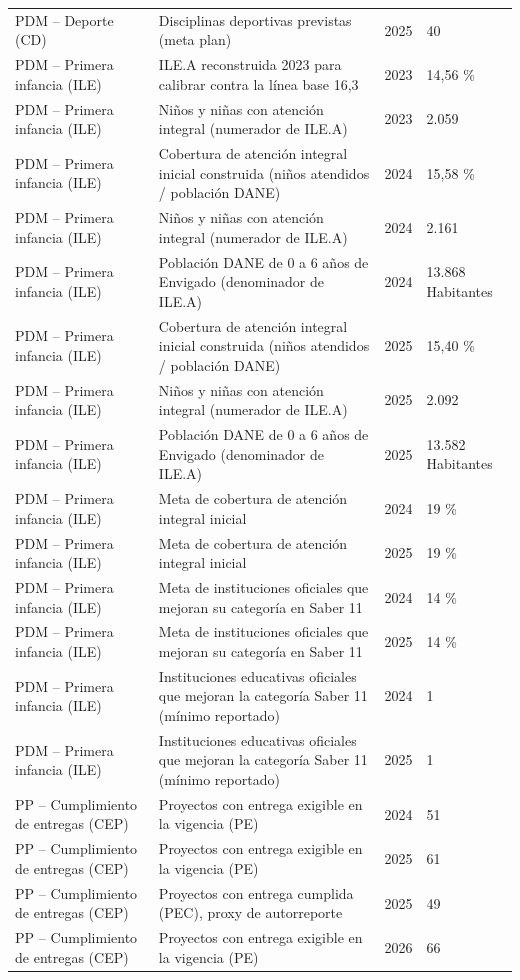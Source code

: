 \documentclass[11pt,letterpaper]{article}
\begin{document}
{\begin{xltabular}{\linewidth}{L{4cm}YL{1.6cm}L{2.6cm}}
PDM -- Deporte (CD) & Disciplinas deportivas previstas (meta plan) & 2025 & 40 \\
PDM -- Primera infancia (ILE) & ILE.A reconstruida 2023 para calibrar contra la línea base 16,3 & 2023 & 14,56 \% \\
PDM -- Primera infancia (ILE) & Niños y niñas con atención integral (numerador de ILE.A) & 2023 & 2.059 \\
PDM -- Primera infancia (ILE) & Cobertura de atención integral inicial construida (niños atendidos / población DANE) & 2024 & 15,58 \% \\
PDM -- Primera infancia (ILE) & Niños y niñas con atención integral (numerador de ILE.A) & 2024 & 2.161 \\
PDM -- Primera infancia (ILE) & Población DANE de 0 a 6 años de Envigado (denominador de ILE.A) & 2024 & 13.868 Habitantes \\
PDM -- Primera infancia (ILE) & Cobertura de atención integral inicial construida (niños atendidos / población DANE) & 2025 & 15,40 \% \\
PDM -- Primera infancia (ILE) & Niños y niñas con atención integral (numerador de ILE.A) & 2025 & 2.092 \\
PDM -- Primera infancia (ILE) & Población DANE de 0 a 6 años de Envigado (denominador de ILE.A) & 2025 & 13.582 Habitantes \\
PDM -- Primera infancia (ILE) & Meta de cobertura de atención integral inicial & 2024 & 19 \% \\
PDM -- Primera infancia (ILE) & Meta de cobertura de atención integral inicial & 2025 & 19 \% \\
PDM -- Primera infancia (ILE) & Meta de instituciones oficiales que mejoran su categoría en Saber 11 & 2024 & 14 \% \\
PDM -- Primera infancia (ILE) & Meta de instituciones oficiales que mejoran su categoría en Saber 11 & 2025 & 14 \% \\
PDM -- Primera infancia (ILE) & Instituciones educativas oficiales que mejoran la categoría Saber 11 (mínimo reportado) & 2024 & 1 \\
PDM -- Primera infancia (ILE) & Instituciones educativas oficiales que mejoran la categoría Saber 11 (mínimo reportado) & 2025 & 1 \\
PP -- Cumplimiento de entregas (CEP) & Proyectos con entrega exigible en la vigencia (PE) & 2024 & 51 \\
PP -- Cumplimiento de entregas (CEP) & Proyectos con entrega exigible en la vigencia (PE) & 2025 & 61 \\
PP -- Cumplimiento de entregas (CEP) & Proyectos con entrega cumplida (PEC), proxy de autorreporte & 2025 & 49 \\
PP -- Cumplimiento de entregas (CEP) & Proyectos con entrega exigible en la vigencia (PE) & 2026 & 66 \\
\end{xltabular}
}
\end{document}
